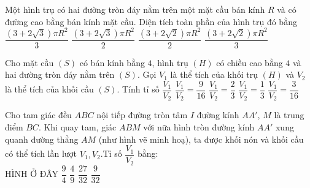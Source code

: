 \begin{ex}
	Một hình trụ có hai đường tròn đáy nằm trên một mặt cầu bán kính $R$ và có đường cao bằng bán kính mặt cầu. Diện tích toàn phần của hình trụ đó bằng
	\choice
	{$\dfrac{\left(3+2\sqrt{3}\right)\pi{R^2}}{3}$}
	{\True $\dfrac{\left(3+2\sqrt{3}\right)\pi{R^2}}{2}$}
	{$\dfrac{\left(3+2\sqrt{2}\right)\pi{R^2}}{2}$}
	{$\dfrac{\left(3+2\sqrt{2}\right)\pi{R^2}}{3}$}
\end{ex}
\begin{ex}
	[Mã 110 2017]%
	Cho mặt cầu $(S)$ có bán kính bằng $4$, hình trụ $(H)$ có chiều cao bằng $4$ và hai đường tròn đáy nằm trên $(S)$. Gọi $V_1$ là thể tích của khối trụ $(H)$ và $V_2$ là thể tích của khối cầu $(S)$. Tính tỉ số $\dfrac{V_1}{V_2}$ 
	\choice
	{\True $\dfrac{V_1}{V_2}=\dfrac{9}{16}$}
	{$\dfrac{V_1}{V_2}=\dfrac{2}{3}$}
	{$\dfrac{V_1}{V_2}=\dfrac{1}{3}$}
	{$\dfrac{V_1}{V_2}=\dfrac{3}{16}$}
\end{ex}
\begin{ex}
	Cho tam giác đều $ABC$ nội tiếp đường tròn tâm $I$ đường kính $A{A}'$, $M$ là trung điểm $BC$. Khi quay tam, giác $ABM$ với nữa hình tròn đường kính $A{A}'$ xung quanh đường thẳng $AM$ (như hình vẽ minh hoạ), ta được khối nón và khối cầu có thể tích lần lượt $V_1,V_2$.Tỉ số $\dfrac{V_1}{V_2}$ bằng:\\
	{\color{red}HÌNH Ở ĐÂY}
	\choice
	{$\dfrac{9}{4}$}
	{$\dfrac{4}{9}$}
	{$\dfrac{27}{32}$}
	{\True $\dfrac{9}{32}$}
\end{ex}
